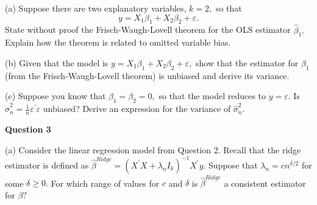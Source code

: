 \documentclass{article}
\begin{document}
(a) Suppose there are two explanatory variables, $k=2,$ so that 
\begin{equation*}
y=X_{1}\beta _{1}+X_{2}\beta _{2}+\varepsilon .
\end{equation*}
State without proof the Frisch-Waugh-Lovell theorem for the OLS estimator $%
\hat{\beta}_{1}.$ Explain how the theorem is related to omitted variable
bias.

(b) Given that the model is $y=X_{1}\beta _{1}+X_{2}\beta _{2}+\varepsilon ,$
show that the estimator for $\beta _{1}$ (from the Frisch-Waugh-Lovell
theorem) is unbiased and derive its variance.

(c) Suppose you know that $\beta _{1}=\beta _{2}=0,$ so that the model
reduces to $y=\varepsilon .$ Is $\hat{\sigma}_{n}^{2}=\frac{1}{n}\varepsilon
^{\prime }\varepsilon $ unbiased? Derive an expression for the variance of $%
\hat{\sigma}_{n}^{2}.$\bigskip 

\textbf{Question 3 }

(a) Consider the linear regression model from Question 2. Recall that the
ridge estimator is defined as $\hat{\beta}^{Ridge}=\left( X^{\prime
}X+\lambda _{n}I_{k}\right) ^{-1}X^{\prime }y.$ Suppose that $\lambda
_{n}=cn^{\delta /2}$ for some $\delta \geq 0.$ For which range of values for 
$c$ and $\delta $ is $\hat{\beta}^{Ridge}$ a consistent estimator for $\beta
?$
\end{document}
